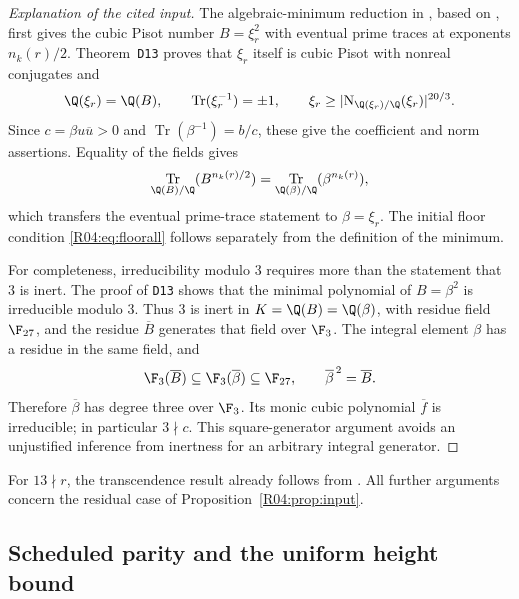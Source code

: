 \documentclass[11pt,a4paper]{article}
\theoremstyle{definition}\newtheorem{definition}[theorem]{Definition}
\theoremstyle{remark}\newtheorem{remark}[theorem]{Remark}
\DeclareMathOperator{\Tr}{Tr}\DeclareMathOperator{\tr}{tr}\DeclareMathOperator{\Nm}{N}
\begin{document}
\begin{proof}[Explanation of the cited input]
The algebraic-minimum reduction in \cite[Section~2]{K064}, based on
\cite[Proposition~3.1]{Saito}, first gives the cubic Pisot number
$B=\xi_r^2$ with eventual prime traces at exponents $n_k(r)/2$.
Theorem~\texttt{D13} proves that $\xi_r$ itself is cubic Pisot with
nonreal conjugates and
\[
 \Q(\xi_r)=\Q(B),\qquad
 \Tr(\xi_r^{-1})=\pm1,\qquad
 \xi_r\ge\lvert\operatorname{N}_{\Q(\xi_r)/\Q}(\xi_r)\rvert^{20/3}.
\]
Since $c=\beta u\overline u>0$ and $\Tr(\beta^{-1})=b/c$, these give
the coefficient and norm assertions. Equality of the fields gives
\[
 \Tr_{\Q(B)/\Q}(B^{n_k(r)/2})
 =\Tr_{\Q(\beta)/\Q}(\beta^{n_k(r)}),
\]
which transfers the eventual prime-trace statement to $\beta=\xi_r$.
The initial floor condition \eqref{R04:eq:floorall} follows separately
from the definition of the minimum.

For completeness, irreducibility modulo $3$ requires more than the
statement that $3$ is inert. The proof of \texttt{D13} shows that the
minimal polynomial of $B=\beta^2$ is irreducible modulo $3$.
Thus $3$ is inert in $K=\Q(B)=\Q(\beta)$, with residue field $\F_{27}$,
and the residue $\overline B$ generates that field over $\F_3$.
The integral element $\beta$ has a residue in the same field, and
\[
 \F_3(\overline B)\subseteq\F_3(\overline\beta)\subseteq\F_{27},
 \qquad \overline\beta^{\,2}=\overline B.
\]
Therefore $\overline\beta$ has degree three over $\F_3$.
Its monic cubic polynomial $\overline f$ is irreducible; in particular
$3\nmid c$. This square-generator argument avoids an unjustified
inference from inertness for an arbitrary integral generator.
\end{proof}

For $13\nmid r$, the transcendence result already follows from
\cite[Theorem~B]{K064}. All further arguments concern the residual
case of Proposition~\ref{R04:prop:input}.

\subsection{Scheduled parity and the uniform height bound}
\label{R04:sec:bound}
\end{document}
